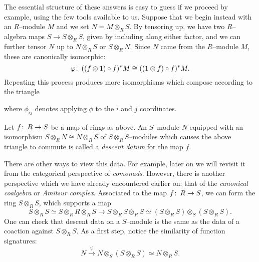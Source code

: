 The essential structure of these answers is easy to guess if we proceed by example, using the few tools available to us.  Suppose that we begin instead with an $R$--module $M$ and we set $N = M \otimes_R S$.  By tensoring up, we have two $R$--algebra maps $S \to S \otimes_R S$, given by including along either factor, and we can further tensor $N$ up to $N \otimes_R S$ or $S \otimes_R N$.  Since $N$ came from the $R$--module $M$, these are canonically isomorphic: \[\varphi\colon\thinspace ((f \otimes 1) \circ f)^* M \cong ((1 \otimes f) \circ f)^* M.\]  Repeating this process produces more isomorphisms which compose according to the triangle
\begin{center}
\end{center}
where $\phi_{ij}$ denotes applying $\phi$ to the $i${\th} and $j${\th} coordinates.

\begin{definition}
Let $f\colon\thinspace R \to S$ be a map of rings as above.  An $S$--module $N$ equipped with an isomorphism $S \otimes_R N \cong N \otimes_R S$ of $S \otimes_R S$--modules which causes the above triangle to commute is called a \textit{descent datum} for the map $f$.
\end{definition}

\begin{remark}\label{CanonicalCoring}
There are other ways to view this data.  For example, later on we will revisit it from the categorical perspective of \textit{comonads}.  However, there is another perspective which we have already encountered earlier on: that of the \textit{canonical coalgebra} or \textit{Amitsur complex}.  Associated to the map $f\colon\thinspace R \to S$, we can form the ring $S \otimes_R S$, which supports a map \[S \otimes_R S \simeq S \otimes_R R \otimes_R S \to S \otimes_R S \otimes_R S \simeq (S \otimes_R S) \otimes_S (S \otimes_R S).\]  One can check that descent data on a $S$--module is the same as the data of a coaction against $S \otimes_R S$.  As a first step, notice the similarity of function signatures: \[N \xrightarrow{\psi} N \otimes_S (S \otimes_R S) \simeq N \otimes_R S.\]
\end{remark}

